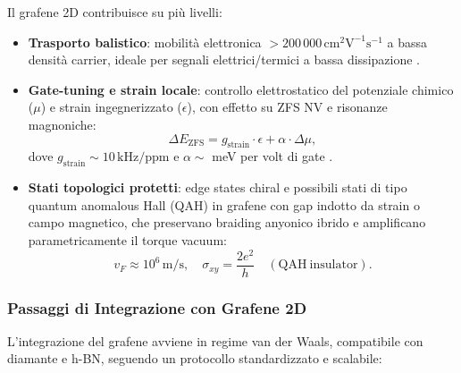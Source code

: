 \documentclass[12pt,a4paper]{article}
\begin{document}
Il grafene 2D contribuisce su più livelli:
\begin{itemize}
    \item \textbf{Trasporto balistico}: mobilità elettronica $>200\,000\,\mathrm{cm}^2\mathrm{V}^{-1}\mathrm{s}^{-1}$ a bassa densità carrier, ideale per segnali elettrici/termici a bassa dissipazione \cite{Geim2012, Novoselov2015}.
    \item \textbf{Gate-tuning e strain locale}: controllo elettrostatico del potenziale chimico ($\mu$) e strain ingegnerizzato ($\epsilon$), con effetto su ZFS NV e risonanze magnoniche:
    \begin{equation}
    \Delta E_{\mathrm{ZFS}} = g_{\mathrm{strain}} \cdot \epsilon + \alpha \cdot \Delta \mu,
    \label{eq:graphene_tuning}
    \end{equation}
    dove $g_{\mathrm{strain}} \sim 10\,\mathrm{kHz}/\mathrm{ppm}$ e $\alpha \sim$ meV per volt di gate \cite{Lee2018, Ku2019}.
    \item \textbf{Stati topologici protetti}: edge states chiral e possibili stati di tipo quantum anomalous Hall (QAH) in grafene con gap indotto da strain o campo magnetico, che preservano braiding anyonico ibrido e amplificano parametricamente il torque vacuum:
    \begin{equation}
    v_F \approx 10^6\,\mathrm{m/s}, \quad \sigma_{xy} = \frac{2e^2}{h} \quad (\mathrm{QAH\ insulator}).
    \label{eq:topological_graphene}
    \end{equation}
\end{itemize}

\subsubsection{Passaggi di Integrazione con Grafene 2D}

L'integrazione del grafene avviene in regime van der Waals, compatibile con diamante e h-BN, seguendo un protocollo standardizzato e scalabile:
\end{document}
